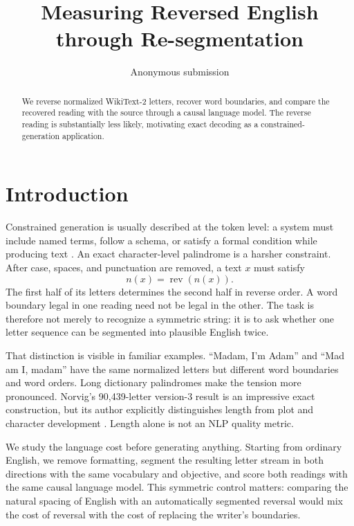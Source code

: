 \documentclass[11pt]{article}
\title{Measuring Reversed English through Re-segmentation}
\author{Anonymous submission}
\newcommand{\norm}[1]{n(#1)}
\newcommand{\rev}{\operatorname{rev}}
\begin{document}
\maketitle

\begin{abstract}
We reverse normalized WikiText-2 letters, recover word boundaries, and compare the recovered reading with the source through a causal language model. The reverse reading is substantially less likely, motivating exact decoding as a constrained-generation application.
\end{abstract}

\section{Introduction}

Constrained generation is usually described at the token level: a system must
include named terms, follow a schema, or satisfy a formal condition while
producing text \citep{hokamp2017grid,post2018fast,lu2022astar}. An exact
character-level palindrome is a harsher constraint. After case, spaces, and
punctuation are removed, a text $x$ must satisfy
\begin{equation}
  \norm{x}=\rev(\norm{x}).
\end{equation}
The first half of its letters determines the second half in reverse order. A
word boundary legal in one reading need not be legal in the other. The task is
therefore not merely to recognize a symmetric string: it is to ask whether one
letter sequence can be segmented into plausible English twice.

That distinction is visible in familiar examples. ``Madam, I'm Adam'' and
``Mad am I, madam'' have the same normalized letters but different word
boundaries and word orders. Long dictionary palindromes make the tension more
pronounced. Norvig's 90,439-letter version-3 result is an impressive exact
construction, but its author explicitly distinguishes length from plot and
character development \citep{norvig2016palindrome}. Length alone is not an
NLP quality metric.

We study the language cost before generating anything. Starting from ordinary
English, we remove formatting, segment the resulting letter stream in both
directions with the same vocabulary and objective, and score both readings
with the same causal language model. This symmetric control matters: comparing
the natural spacing of English with an automatically segmented reversal would
mix the cost of reversal with the cost of replacing the writer's boundaries.
\end{document}
